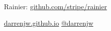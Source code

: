 \documentclass[mathserif,handout]{beamer}
\begin{document}
\begin{frame}
\begin{thebibliography}{}
    
    
%
    
  \end{thebibliography}

  \vspace*{0.8ex}

  Rainier:
  \alert{\url{github.com/stripe/rainier}}


 \alert{\url{darrenjw.github.io}} \hfill \url{@darrenjw}
  
\end{frame}
\end{document}
